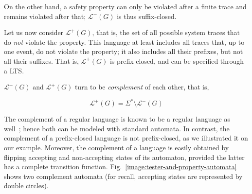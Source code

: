 On the other hand, a safety property can only be violated after a finite trace and remains violated after that; $\mathcal{L}^{-}(G)$ is thus suffix-closed. 

Let us now consider $\mathcal{L}^{+}(G)$, that is, the set of all possible system traces that do \emph{not} violate the property. This language at least includes all traces that, up to one event, do not violate the property; it also includes all their prefixes, but not all their suffixes. That is, $\mathcal{L}^{+}(G)$ is prefix-closed, and can be specified through a LTS. 

$\mathcal{L}^{-}(G)$ and $\mathcal{L}^{+}(G)$ turn to be \emph{complement} of each other, that is, 

\begin{equation}
\mathcal{L}^{+}(G) = \Sigma^{*} \setminus \mathcal{L}^{-}(G)
\end{equation}

The complement of a regular language is known to be a regular language as well~\cite{Hopcroft:1979}; hence both can be modeled with standard automata. In contrast, the complement of a prefix-closed language is not prefix-closed, as we illustrated it on our example. Moreover, the complement of a language is easily obtained by flipping accepting and non-accepting states of its automaton, provided the latter has a complete transition function. Fig.~\ref{image:tester-and-property-automata} shows two complement automata (for recall, accepting states are represented by double circles). 

